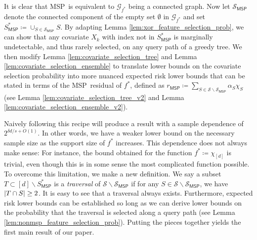 \documentclass[11pt]{article}
\DeclarePairedDelimiter{\abs}{|}{|}
\newcommand{\sparsity}{s}
\newcommand{\nfeats}{d}
\newcommand{\coordindices}{[\nfeats]}
\newcommand{\MSP}{\textsf{MSP}}
\newcommand{\suppset}{S^*}
\newcommand{\monomial}{\chi}
\newcommand{\fcoefs}{\mathcal{S}}
\newcommand{\graph}{\mathcal{G}}
\begin{document}
It is clear that \MSP~is equivalent to $\graph_{f^*}$ being a connected graph.
Now let $\fcoefs_{\MSP}$ denote the connected component of the empty set $\emptyset$ in $\graph_{f^*}$ and set $\suppset_{\MSP} \coloneqq \cup_{S \in \fcoefs_{\MSP}} S$.
By adapting Lemma \ref{lem:xor_feature_selection_prob}, we can show that any covariate $X_k$ with index not in $\suppset_{\MSP}$ is marginally undetectable, and thus rarely selected, on any query path of a greedy tree.
We then modify Lemma \ref{lem:covariate_selection_tree} and Lemma \ref{lem:covariate_selection_ensemble} to translate lower bounds on the covariate selection probability into more nuanced expected risk lower bounds that can be stated in terms of the \MSP~residual of $f^*$, defined as $r_{\MSP} \coloneqq \sum_{S\in \fcoefs\backslash\fcoefs_{\MSP}}\alpha_S\monomial_S$ (see Lemma \ref{lem:covariate_selection_tree_v2} and Lemma \ref{lem:covariate_selection_ensemble_v2}).

Naively following this recipe will produce a result with a sample dependence of $2^{\delta \nfeats/\sparsity + O(1)}$.
In other words, we have a weaker lower bound on the necessary sample size as the support size of $f^*$ increases.
This dependence does not always make sense:
For instance, the bound obtained for the function $f^* \coloneqq \monomial_{\coordindices}$ is trivial, even though this is in some sense the most complicated function possible.
To overcome this limitation, we make a new definition.
We say a subset $T \subset \coordindices\backslash \suppset_{\MSP} $ is a \emph{traversal} of $\fcoefs\backslash\fcoefs_{\MSP}$ if for any $S \in \fcoefs\backslash\fcoefs_{\MSP}$, we have $\abs{T\cap S} \geq 2$.
It is easy to see that a traversal always exists.
Furthermore, expected risk lower bounds can be established so long as we can derive lower bounds on the probability that the traversal is selected along a query path (see Lemma \ref{lem:nonmsp_feature_selection_prob}).
Putting the pieces together yields the first main result of our paper.
\end{document}
